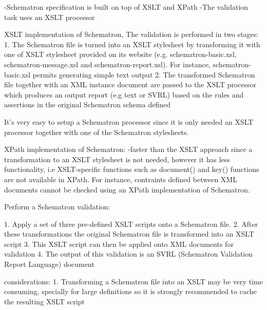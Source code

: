 -Schematron specification is built on top of XSLT and XPath
-The validation task uses an XSLT processor

XSLT implementation of Schematron, The validation is performed in two stages:
	1. The Schematron file is turned into an XSLT stylesheet by transforming it with one of XSLT stylesheet
	provided on its website (e.g. schematron-basic.xsl, schematron-message.xsl and schematron-report.xsl).
	For instance, schematron-basic.xsl permits generating simple text output
	2. The transformed Schematron file together with an XML instance document are passed to the XSLT processor
	which produces an output report (e.g text or SVRL) based on the rules and assertions in the original Schematron schema defined

It's very easy to setup a Schematron processor since it is only needed an XSLT processor together with one of
the Schematron stylesheets.

XPath implementation of Schematron:
	-faster than the XSLT approach since a transformation to an XSLT stylesheet is not needed, however
	it has less functionality, i.e XSLT-specific functions such as document() and key() functions are not
	available in XPath. For instance, contraints defined between XML documents cannot be checked using an
	XPath implementation of Schematron.

Perform a Schematron validation:

	1. Apply a set of three pre-defined XSLT scripts onto a Schematron file.
	2. After these transformations the original Schematron file is transformed into an XSLT script
	3. This XSLT script can then be applied onto XML documents for validation
	4. The output of this validation is an SVRL (Schematron Validation Report Language) document

considerations:
	1. Transforming a Schematron file into an XSLT may be very time consuming, specially for large
	definitions so it is strongly recommended to cache the resulting XSLT script

